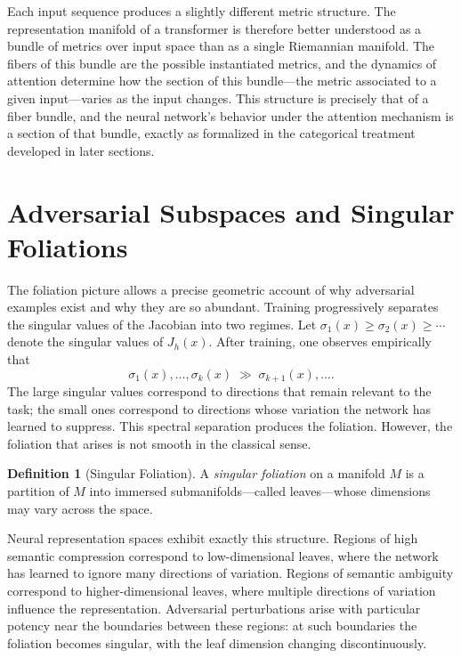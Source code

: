 \documentclass[12pt,a4paper]{article}
\theoremstyle{plain}
\theoremstyle{definition}
\newtheorem{definition}[theorem]{Definition}
\begin{document}
Each input sequence produces a slightly different metric structure. The
representation manifold of a transformer is therefore better understood as a
bundle of metrics over input space than as a single Riemannian manifold. The
fibers of this bundle are the possible instantiated metrics, and the dynamics
of attention determine how the section of this bundle---the metric associated
to a given input---varies as the input changes. This structure is precisely
that of a fiber bundle, and the neural network's behavior under the attention
mechanism is a section of that bundle, exactly as formalized in the categorical
treatment developed in later sections.

\section{Adversarial Subspaces and Singular Foliations}
\label{sec:foliation}

The foliation picture allows a precise geometric account of why adversarial
examples exist and why they are so abundant. Training progressively separates
the singular values of the Jacobian into two regimes. Let $\sigma_1(x) \geq
\sigma_2(x) \geq \cdots$ denote the singular values of $J_h(x)$. After
training, one observes empirically that
\[
\sigma_1(x), \dots, \sigma_k(x) \;\gg\; \sigma_{k+1}(x), \dots .
\]
The large singular values correspond to directions that remain relevant to the
task; the small ones correspond to directions whose variation the network has
learned to suppress. This spectral separation produces the foliation. However,
the foliation that arises is not smooth in the classical sense.

\begin{definition}[Singular Foliation]
A \emph{singular foliation} on a manifold $M$ is a partition of $M$ into
immersed submanifolds---called leaves---whose dimensions may vary across
the space.
\end{definition}

Neural representation spaces exhibit exactly this structure. Regions of high
semantic compression correspond to low-dimensional leaves, where the network
has learned to ignore many directions of variation. Regions of semantic
ambiguity correspond to higher-dimensional leaves, where multiple directions of
variation influence the representation. Adversarial perturbations arise with
particular potency near the boundaries between these regions: at such boundaries
the foliation becomes singular, with the leaf dimension changing discontinuously.
\end{document}
